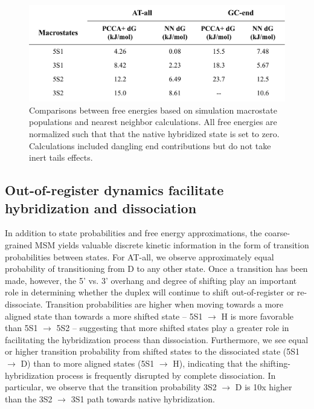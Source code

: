 \documentclass[journal=jpcbfk,manuscript=article]{achemso}
\begin{document}
\begin{figure}[ht!] %
	\begin{center} 
        \includegraphics[width=120mm, scale=1]{Fig5.pdf}
        \caption{Comparisons between free energies based on simulation macrostate populations and nearest neighbor calculations. All free energies are normalized such that that the native hybridized state is set to zero. Calculations included dangling end contributions but do not take inert tails effects.}

        \label{fig:NN_table}
	\end{center}
\end{figure}


\subsection{Out-of-register dynamics facilitate hybridization and dissociation}

In addition to state probabilities and free energy approximations, the coarse-grained MSM yields valuable discrete kinetic information in the form of transition probabilities between states. For AT-all, we observe approximately equal probability of transitioning from D to any other state. Once a transition has been made, however, the 5' vs. 3' overhang and degree of shifting play an important role in determining whether the duplex will continue to shift out-of-register or re-dissociate. Transition probabilities are higher when moving towards a more aligned state than towards a more shifted state -- 5S1 $\rightarrow$ H is more favorable than 5S1 $\rightarrow$ 5S2 -- suggesting that more shifted states play a greater role in facilitating the hybridization process than dissociation. Furthermore, we see equal or higher transition probability from shifted states to the dissociated state (5S1 $\rightarrow$ D) than to more aligned states (5S1 $\rightarrow$ H), indicating that the shifting-hybridization process is frequently disrupted by complete dissociation. In particular, we observe that the transition probability 3S2 $\rightarrow$ D is 10x higher than the 3S2 $\rightarrow$ 3S1 path towards native hybridization. 
\end{document}
